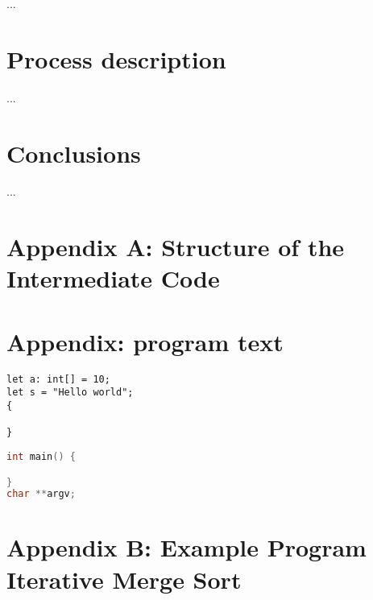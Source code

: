 \documentclass[a4paper]{article}
\begin{document}
...

%

\section{Process description}

...

\section{Conclusions}

...

\section{Appendix A: Structure of the Intermediate Code}
\label{appendix_a}

\section{Appendix: program text}




\begin{lstlisting}[laguage=DPL]
let a: int[] = 10;
let s = "Hello world";
{

}
\end{lstlisting}

\begin{lstlisting}[language=C]
int main() {

}
char **argv;
\end{lstlisting}


\clearpage
\section{Appendix B: Example Program Iterative Merge Sort}
\label{appendix_b}
\end{document}

